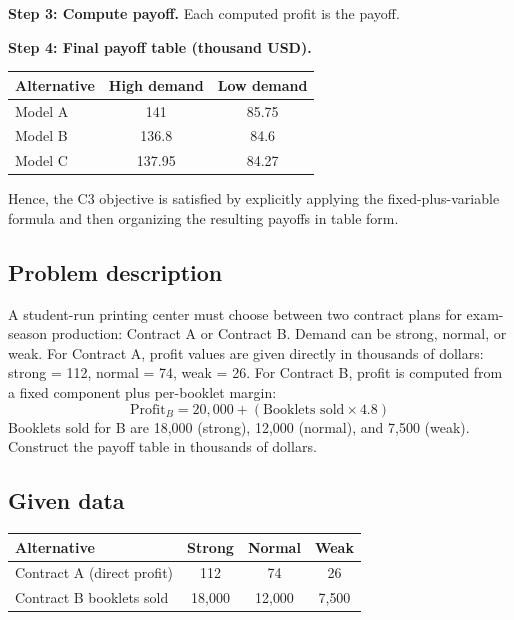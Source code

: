 \begin{ExamProblems}
		\textbf{Step 3: Compute payoff.} Each computed profit is the payoff.
		
		\textbf{Step 4: Final payoff table (thousand USD).}
		\begin{center}
			\begin{tabular}{l c c}
				\toprule
				Alternative & High demand & Low demand \\
				\midrule
				Model A & 141 & 85.75 \\
				Model B & 136.8 & 84.6 \\
				Model C & 137.95 & 84.27 \\
				\bottomrule
			\end{tabular}
		\end{center}
		
		Hence, the C3 objective is satisfied by explicitly applying the fixed-plus-variable formula and then organizing the resulting payoffs in table form.
		
		\item
		\subsection*{Problem description}
		A student-run printing center must choose between two contract plans for exam-season production: Contract A or Contract B.
		Demand can be strong, normal, or weak. For Contract A, profit values are given directly in thousands of dollars:
		strong = 112, normal = 74, weak = 26.
		For Contract B, profit is computed from a fixed component plus per-booklet margin:
		\[
		\text{Profit}_B = 20{,}000 + (\text{Booklets sold} \times 4.8)
		\]
		Booklets sold for B are 18{,}000 (strong), 12{,}000 (normal), and 7{,}500 (weak).
		Construct the payoff table in thousands of dollars.
		
		\subsection*{Given data}
		\begin{center}
			\begin{tabular}{l c c c}
				\toprule
				Alternative & Strong & Normal & Weak \\
				\midrule
				Contract A (direct profit) & 112 & 74 & 26 \\
				Contract B booklets sold & 18{,}000 & 12{,}000 & 7{,}500 \\
				\bottomrule
			\end{tabular}
		\end{center}
		

\end{ExamProblems}
